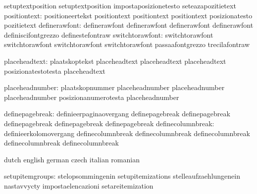                                   setuptextposition                setuptextposition
                                  impostaposizionetesto            seteazapozitietext
                    positiontext: positioneertekst                 positiontext
                                  positiontext                     positiontext
                                  posizionatesto                   pozitietext %
                   definerawfont: definerawfont                    definerawfont
                                  definerawfont                    definerawfont
                                  definiscifontgrezzo              definestefontraw
                 switchtorawfont: switchtorawfont                  switchtorawfont
                                  switchtorawfont                  switchtorawfont
                                  passaafontgrezzo                 trecilafontraw

  placeheadtext: plaatskoptekst           placeheadtext
                 placeheadtext            placeheadtext
                 posizionatestotesta      placeheadtext

placeheadnumber: plaatskopnummer          placeheadnumber
                 placeheadnumber          placeheadnumber
                 posizionanumerotesta     placeheadnumber

  definepagebreak: definieerpaginaovergang  definepagebreak
                   definepagebreak          definepagebreak
                   definepagebreak          definepagebreak
definecolumnbreak: definieerkolomovergang  definecolumnbreak
                   definecolumnbreak       definecolumnbreak
                   definecolumnbreak       definecolumnbreak

\stopcommands



\startcommands                    dutch                            english
                                  german                           czech
                                  italian                          romanian


                 setupitemgroups: stelopsommingenin                setupitemizations
                                  stelleaufzaehlungenein           nastavvycty
                                  impostaelencazioni               setareitemization

\stopcommands

